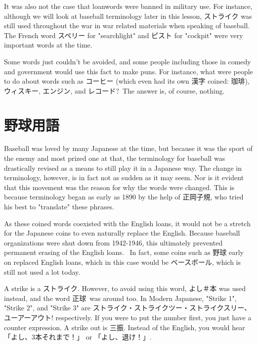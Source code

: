 \par{  It was also not the case that loanwords were banned in military use. For instance, although we will look at baseball terminology later in this lesson, ストライク was still used throughout the war in war related materials when speaking of baseball. The French word スペリー for "searchlight" and ピスト for "cockpit" were very important words at the time. }

\par{ Some words just couldn't be avoided, and some people including those in comedy and government would use this fact to make puns. For instance, what were people to do about words such as コーヒー (which even had its own 漢字 coined: 珈琲), ウィスキー, エンジン, and レコード? The answer is, of course, nothing. }
      
\section{野球用語}
 
\par{ Baseball was loved by many Japanese at the time, but because it was the sport of the enemy and most prized one at that, the terminology for baseball was drastically revised as a means to still play it in a Japanese way. The change in terminology, however, is in fact not as sudden as it may seem. Nor is it evident that this movement was the reason for why the words were changed. This is because terminology began as early as 1890 by the help of 正岡子規, who tried his best to "translate" these phrases. }

\par{ As these coined words coexisted with the English loans, it would not be a stretch for the Japanese coins to even naturally replace the English. Because baseball organizations were shut down from 1942-1946, this ultimately prevented permanent erasing of the English loans.  In fact, some coins such as 野球 early on replaced English loans, which in this case would be ベースボール, which is still not used a lot today. }

\par{ A strike is a ストライク. However, to avoid using this word, よし＃本 was used instead, and the word 正球 was around too. In Modern Japanese, "Strike 1", "Strike 2", and "Strike 3" are ストライク・ストライクツー・ストライクスリー、ユーアーアウト! respectively. If you were to put the number first, you just have a counter expression. A strike out is 三振. Instead of the English, you would hear 「よし、3本それまで！」 or 「よし、退け！」. }

